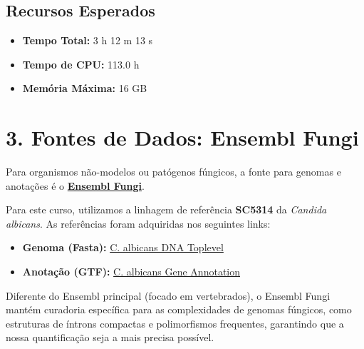 \documentclass[
  letterpaper,
  DIV=11,
  numbers=noendperiod]{scrreprt}
\providecommand{\tightlist}{%
  \setlength{\itemsep}{0pt}\setlength{\parskip}{0pt}}
\begin{document}
\subsection{Recursos Esperados}\label{recursos-esperados-1}

\begin{itemize}
\tightlist
\item
  \textbf{Tempo Total:} 3 h 12 m 13 s
\item
  \textbf{Tempo de CPU:} 113.0 h
\item
  \textbf{Memória Máxima:} 16 GB
\end{itemize}

\section{3. Fontes de Dados: Ensembl
Fungi}\label{fontes-de-dados-ensembl-fungi}

Para organismos não-modelos ou patógenos fúngicos, a fonte para genomas
e anotações é o \href{https://fungi.ensembl.org/}{\textbf{Ensembl
Fungi}}.

Para este curso, utilizamos a linhagem de referência \textbf{SC5314} da
\emph{Candida albicans}. As referências foram adquiridas nos seguintes
links:

\begin{itemize}
\tightlist
\item
  \textbf{Genoma (Fasta):}
  \href{https://fungi.ensembl.org/Candida_albicans_sc5314_gca_000784655/Info/Index}{C.
  albicans DNA Toplevel}
\item
  \textbf{Anotação (GTF):}
  \href{https://fungi.ensembl.org/Candida_albicans_sc5314_gca_000784655/Info/Index}{C.
  albicans Gene Annotation}
\end{itemize}

\begin{tcolorbox}[enhanced jigsaw, arc=.35mm, colframe=quarto-callout-important-color-frame, breakable, bottomrule=.15mm, colback=white, left=2mm, titlerule=0mm, opacityback=0, title=\textcolor{quarto-callout-important-color}{\faExclamation}\hspace{0.5em}{Por que usar o Ensembl Fungi?}, leftrule=.75mm, colbacktitle=quarto-callout-important-color!10!white, bottomtitle=1mm, toprule=.15mm, toptitle=1mm, rightrule=.15mm, opacitybacktitle=0.6, coltitle=black]

Diferente do Ensembl principal (focado em vertebrados), o Ensembl Fungi
mantém curadoria específica para as complexidades de genomas fúngicos,
como estruturas de íntrons compactas e polimorfismos frequentes,
garantindo que a nossa quantificação seja a mais precisa possível.

\end{tcolorbox}
\end{document}
